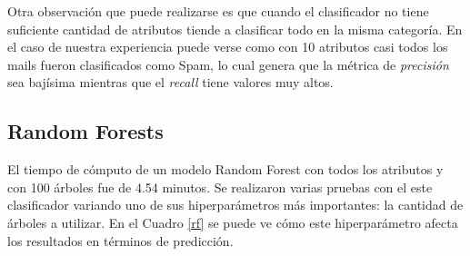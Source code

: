 \documentclass[10pt,a4paper]{article}
\begin{document}
Otra observación que puede realizarse es que cuando el clasificador no tiene suficiente cantidad de atributos tiende a clasificar todo en la misma categoría. En el caso de nuestra experiencia puede verse como con 10 atributos casi todos los mails fueron clasificados como Spam, lo cual genera que la métrica de \textit{precisión} sea bajísima mientras que el \textit{recall} tiene valores muy altos.

\pagebreak

\subsection{Random Forests}

El tiempo de cómputo de un modelo Random Forest con todos los atributos y con 100 árboles fue de 4.54 minutos. Se realizaron varias pruebas con el este clasificador variando uno de sus hiperparámetros más importantes: la cantidad de árboles a utilizar. En el Cuadro \ref{rf} se puede ve cómo este hiperparámetro afecta los resultados en términos de predicción.
\end{document}
